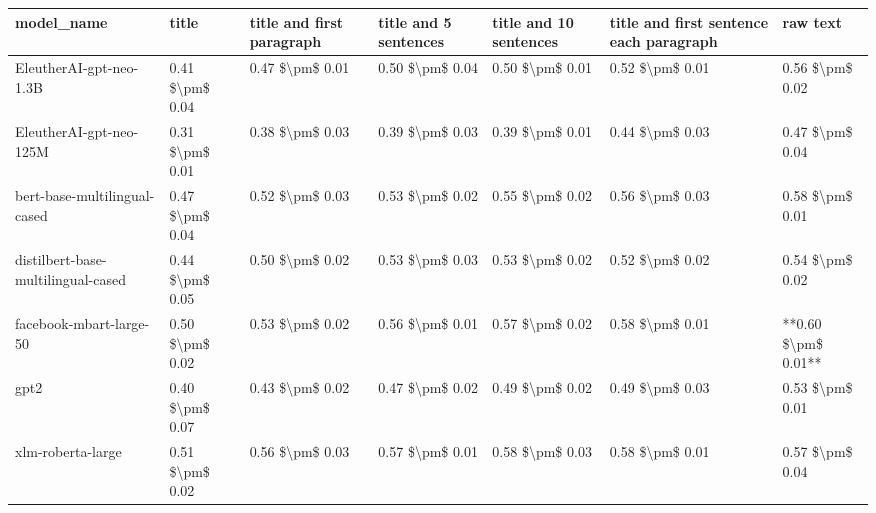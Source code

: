 \begin{tabular}{lllllll}
\toprule
                        model\_name &           title & title and first paragraph & title and 5 sentences & title and 10 sentences & title and first sentence each paragraph &            raw text \\
\midrule
           EleutherAI-gpt-neo-1.3B & 0.41 \$\textbackslash pm\$ 0.04 &           0.47 \$\textbackslash pm\$ 0.01 &       0.50 \$\textbackslash pm\$ 0.04 &        0.50 \$\textbackslash pm\$ 0.01 &                         0.52 \$\textbackslash pm\$ 0.01 &     0.56 \$\textbackslash pm\$ 0.02 \\
           EleutherAI-gpt-neo-125M & 0.31 \$\textbackslash pm\$ 0.01 &           0.38 \$\textbackslash pm\$ 0.03 &       0.39 \$\textbackslash pm\$ 0.03 &        0.39 \$\textbackslash pm\$ 0.01 &                         0.44 \$\textbackslash pm\$ 0.03 &     0.47 \$\textbackslash pm\$ 0.04 \\
      bert-base-multilingual-cased & 0.47 \$\textbackslash pm\$ 0.04 &           0.52 \$\textbackslash pm\$ 0.03 &       0.53 \$\textbackslash pm\$ 0.02 &        0.55 \$\textbackslash pm\$ 0.02 &                         0.56 \$\textbackslash pm\$ 0.03 &     0.58 \$\textbackslash pm\$ 0.01 \\
distilbert-base-multilingual-cased & 0.44 \$\textbackslash pm\$ 0.05 &           0.50 \$\textbackslash pm\$ 0.02 &       0.53 \$\textbackslash pm\$ 0.03 &        0.53 \$\textbackslash pm\$ 0.02 &                         0.52 \$\textbackslash pm\$ 0.02 &     0.54 \$\textbackslash pm\$ 0.02 \\
           facebook-mbart-large-50 & 0.50 \$\textbackslash pm\$ 0.02 &           0.53 \$\textbackslash pm\$ 0.02 &       0.56 \$\textbackslash pm\$ 0.01 &        0.57 \$\textbackslash pm\$ 0.02 &                         0.58 \$\textbackslash pm\$ 0.01 & **0.60 \$\textbackslash pm\$ 0.01** \\
                              gpt2 & 0.40 \$\textbackslash pm\$ 0.07 &           0.43 \$\textbackslash pm\$ 0.02 &       0.47 \$\textbackslash pm\$ 0.02 &        0.49 \$\textbackslash pm\$ 0.02 &                         0.49 \$\textbackslash pm\$ 0.03 &     0.53 \$\textbackslash pm\$ 0.01 \\
                 xlm-roberta-large & 0.51 \$\textbackslash pm\$ 0.02 &           0.56 \$\textbackslash pm\$ 0.03 &       0.57 \$\textbackslash pm\$ 0.01 &        0.58 \$\textbackslash pm\$ 0.03 &                         0.58 \$\textbackslash pm\$ 0.01 &     0.57 \$\textbackslash pm\$ 0.04 \\
\bottomrule
\end{tabular}
